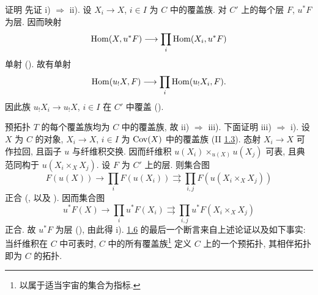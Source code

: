 \begin{enonce*}[remark]{证明}
先证 i) $\Rightarrow$ ii). 设 $X_i\rightarrow X$, $i\in I$ 为 $C$ 中的覆盖族.
对 $C'$ 上的每个层 $F$, $u^\ast F$ 为层. 因而映射
$$
\operatorname{Hom}(X,u^\ast F)\longrightarrow \prod_i\operatorname{Hom}(X_i,u^\ast F)
$$
单射 (). 故有单射
$$
\operatorname{Hom}(u_{!}X,F)\longrightarrow \prod_i \operatorname{Hom}(u_{!}X_i, F){}.
$$
因此族 $u_{!}X_i\rightarrow u_{!}X$, $i\in I$ 在 $C'$ 中覆盖
().

预拓扑 $T$ 的每个覆盖族均为 $C$ 中的覆盖族, 故 ii) $\Rightarrow$ iii).
下面证明 iii) $\Rightarrow$ i). 设 $X$ 为 $C$ 的对象,\pageoriginale
$X_i\rightarrow X$, $i\in I$ 为 $\operatorname{Cov}(X)$ 中的覆盖族
(II \hyperref[II.def1.3]{1.3}). 态射 $X_i\rightarrow X$ 可作拉回,
且函子 $u$ 与纤维积交换. 因而纤维积 $u(X_i)\times_{u(X)} u(X_j)$ 可表,
且典范同构于 $u(X_i\times_X X_j)$. 设 $F$ 为 $C'$ 上的层. 则集合图
$$
F(u(X))\rightarrow \prod_i F(u(X_i))\rightrightarrows
\prod_{i,j}F(u(X_i\times_X X_j))
$$
正合 (, 
以及 ). 因而集合图
$$
u^\ast F(X)\rightarrow \prod_i u^\ast F(X_i)\rightrightarrows
\prod_{i,j}u^\ast F(X_i\times_X X_j)
$$
正合. 故 $u^\ast F$ 为层 (), 由此得 i).
\hyperref[III.prop1.6]{1.6} 的最后一个断言来自上述论证以及如下事实:
当纤维积在 $C$ 中可表时, $C$ 中的所有覆盖族\footnote[1]{以属于适当宇宙的集合为指标.}
定义 $C$ 上的一个预拓扑, 其相伴拓扑即为 $C$ 的拓扑.
\end{enonce*}




